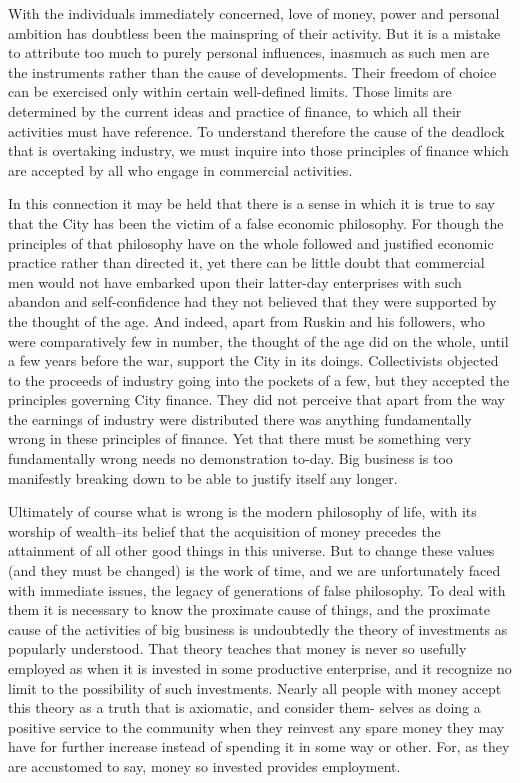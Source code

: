 \documentclass{book}
\begin{document}
With the individuals immediately concerned, love of money, power and personal ambition has doubtless been the mainspring of their activity. But it is a mistake to attribute too much to purely personal influences, inasmuch as such men are the instruments rather than the cause of developments. Their freedom of choice can be exercised only within certain well-defined limits. Those limits are determined by the current ideas and practice of finance, to which all their activities must have reference. To understand therefore the cause of the deadlock that is overtaking industry, we must inquire into those principles of finance which are accepted by all who engage in commercial activities.

In this connection it may be held that there is a sense in which it is true to say that the City has been the victim of a false economic philosophy. For though the principles of that philosophy have on the whole followed and justified economic practice rather than directed it, yet there can be little doubt that commercial men would not have embarked upon their latter-day enterprises with such abandon and self-confidence had they not believed that they were supported by the thought of the age. And indeed, apart from Ruskin and his followers, who were comparatively few in number, the thought of the age did on the whole, until a few years before the war, support the City in its doings. Collectivists objected to the proceeds of industry going into the pockets of a few, but they accepted the principles governing City finance. They did not perceive that apart from the way the earnings of industry were distributed there was anything fundamentally wrong in these principles of finance. Yet that there must be something very fundamentally wrong needs no demonstration to-day. Big business is too manifestly breaking down to be able to justify itself any longer.

Ultimately of course what is wrong is the modern philosophy of life, with its worship of wealth–its belief that the acquisition of money precedes the attainment of all other good things in this universe. But to change these values (and they must be changed) is the work of time, and we are unfortunately faced with immediate issues, the legacy of generations of false philosophy. To deal with them it is necessary to know the proximate cause of things, and the proximate cause of the activities of big business is undoubtedly the theory of investments as popularly understood. That theory teaches that money is never so usefully employed as when it is invested in some productive enterprise, and it recognize no limit to the possibility of such investments. Nearly all people with money accept this theory as a truth that is axiomatic, and consider them- selves as doing a positive service to the community when they reinvest any spare money they may have for further increase instead of spending it in some way or other. For, as they are accustomed to say, money so invested provides employment.
\end{document}
